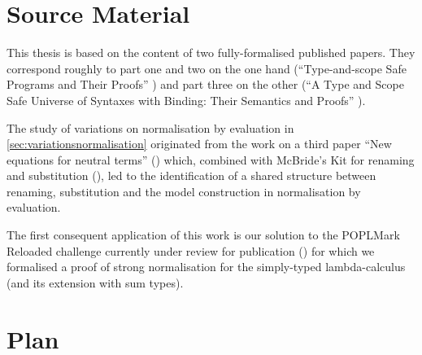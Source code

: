 \section{Source Material}

This thesis is based on the content of two fully-formalised published papers. They
correspond roughly to part one and two on the one hand
(``Type-and-scope Safe Programs and Their Proofs'' \cite{allais2017type, repo2017})
and part three on the other
(``A Type and Scope Safe Universe of Syntaxes with Binding: Their Semantics and Proofs''
\cite{generic-syntax, repo2018}).

The study of variations on normalisation by evaluation in \cref{sec:variationsnormalisation}
originated from the work on a third paper ``New equations for neutral terms''
(\cite{new-equations}) which, combined with McBride's Kit for renaming and substitution
(\citeyear{mcbride2005type}), led to the identification of a shared structure between renaming,
substitution and the model construction in normalisation by evaluation.

The first consequent application of this work is our solution to the
POPLMark Reloaded challenge currently under review for publication
(\cite{poplmarkreloaded, poplmark2}) for which we formalised a proof of
strong normalisation for the simply-typed lambda-calculus (and its extension
with sum types).

\section{Plan}
